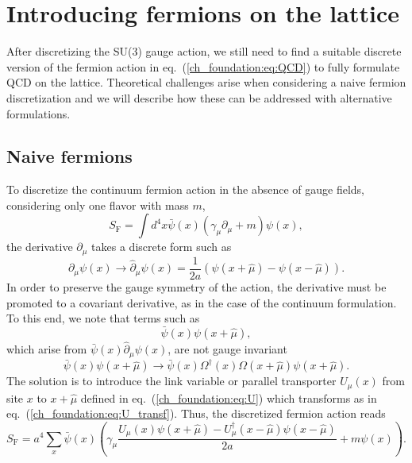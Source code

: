 \section{Introducing fermions on the lattice}
\label{ch_foundation:sec:Fermions}


After discretizing the SU(3) gauge action, we still need to find a suitable discrete version of the fermion action in eq.~(\ref{ch_foundation:eq:QCD}) to fully formulate QCD on the lattice. Theoretical challenges arise when considering a naive fermion discretization and we will describe how these can be addressed with alternative formulations.

\subsection{Naive fermions}
\label{ch_foundation:subsec:Naive}

To discretize the continuum fermion action in the absence of gauge fields, considering only one flavor with mass $m$,
\begin{equation}
S_{\textrm{F}}=\int d^4x\bar{\psi}(x)\left(\gamma_{\mu}\partial_{\mu}+m\right)\psi(x),
\end{equation}
the derivative $\partial_{\mu}$ takes a discrete form such as
\begin{equation}
\partial_{\mu}\psi(x)\rightarrow\hat{\partial}_{\mu}\psi(x)=\frac{1}{2a}\left(\psi(x+\hat{\mu})-\psi(x-\hat{\mu})\right).
\end{equation}
In order to preserve the gauge symmetry of the action, the derivative must be promoted to a covariant derivative, as in the case of the continuum formulation. To this end, we note that terms such as
\begin{equation}
\bar{\psi}(x)\psi(x+\hat{\mu}),
\end{equation}
which arise from $\bar{\psi}(x)\hat{\partial}_{\mu}\psi(x)$, are not gauge invariant
\begin{equation}
\bar{\psi}(x)\psi(x+\hat{\mu})\to\bar{\psi}(x)\Omega^{\dagger}(x)\Omega(x+\hat{\mu})\psi(x+\hat{\mu}).
\end{equation}
The solution is to introduce the link variable or parallel transporter $U_{\mu}(x)$ from site $x$ to $x+\hat{\mu}$ defined in eq.~(\ref{ch_foundation:eq:U}) which transforms as in eq.~(\ref{ch_foundation:eq:U_transf}). Thus, the discretized fermion action reads
\begin{equation}
\label{ch_foundation:eq:naive}
S_{\textrm{F}}=a^4\sum_x\bar{\psi}(x)\left(\gamma_{\mu}\frac{U_{\mu}(x)\psi(x+\hat{\mu})-U_{\mu}^{\dagger}(x-\hat{\mu})\psi(x-\hat{\mu})}{2a}+m\psi(x)\right).
\end{equation}


